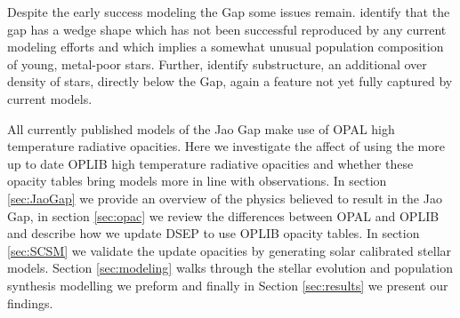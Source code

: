 Despite the early success modeling the Gap some issues remain.
\citet{Jao2020, Jao2021} identify that the gap has a wedge shape which has not been
successful reproduced by any current modeling efforts and which implies a
somewhat unusual population composition of young, metal-poor stars. Further,
\citet{Jao2020} identify substructure, an additional over density of stars,
directly below the Gap, again a feature not yet fully captured by current
models. 

All currently published models of the Jao Gap make use of OPAL high
temperature radiative opacities. Here we investigate the affect of using the
more up to date OPLIB high temperature radiative opacities and whether these
opacity tables bring models more in line with observations. In section
\ref{sec:JaoGap} we provide an overview of the physics believed to result in the
Jao Gap, in section \ref{sec:opac} we review the differences between OPAL
and OPLIB and describe how we update DSEP to use OPLIB opacity tables. In
section \ref{sec:SCSM} we validate the update opacities by generating solar
calibrated stellar models. Section \ref{sec:modeling} walks through the stellar
evolution and population synthesis modelling we preform and finally in Section
\ref{sec:results} we present our findings. 

%

